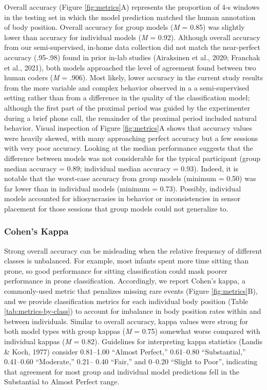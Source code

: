 \documentclass[
  man]{apa6}
\begin{document}
Overall accuracy (Figure \ref{fig:metrics}A) represents the proportion of 4-s windows in the testing set in which the model prediction matched the human annotation of body position. Overall accuracy for group models (\emph{M} = 0.85) was slightly lower than accuracy for individual models (\emph{M} = 0.92). Although overall accuracy from our semi-supervised, in-home data collection did not match the near-perfect accuracy (.95-.98) found in prior in-lab studies (Airaksinen et al., 2020; Franchak et al., 2021), both models approached the level of agreement found between two human coders (\emph{M} = .906). Most likely, lower accuracy in the current study results from the more variable and complex behavior observed in a a semi-supervised setting rather than from a difference in the quality of the classification model; although the first part of the proximal period was guided by the experimenter during a brief phone call, the remainder of the proximal period included natural behavior. Visual inspection of Figure \ref{fig:metrics}A shows that accuracy values were heavily skewed, with many approaching perfect accuracy but a few sessions with very poor accuracy. Looking at the median performance suggests that the difference between models was not considerable for the typical participant (group median accuracy = 0.89; individual median accuracy = 0.93). Indeed, it is notable that the worst-case accuracy from group models (minimum = 0.50) was far lower than in individual models (minimum = 0.73). Possibly, individual models accounted for idiosyncrasies in behavior or inconsistencies in sensor placement for those sessions that group models could not generalize to.

\hypertarget{cohens-kappa}{%
\subsubsection{Cohen's Kappa}\label{cohens-kappa}}

Strong overall accuracy can be misleading when the relative frequency of different classes is unbalanced. For example, most infants spent more time sitting than prone, so good performance for sitting classification could mask poorer performance in prone classification. Accordingly, we report Cohen's kappa, a commonly-used metric that penalizes missing rare events (Figure \ref{fig:metrics}B), and we provide classification metrics for each individual body position (Table \ref{tab:metrics-by-class}) to account for imbalance in body position rates within and between individuals. Similar to overall accuracy, kappa values were strong for both model types with group kappas (\emph{M} = 0.75) somewhat worse compared with individual kappas (\emph{M} = 0.82). Guidelines for interpreting kappa statistics (Landis \& Koch, 1977) consider 0.81--1.00 ``Almost Perfect,'' 0.61--0.80 ``Substantial,'' 0.41--0.60 ``Moderate,'' 0.21-- 0.40 ``Fair,'' and 0--0.20 ``Slight to Poor'', indicating that agreement for most group and individual model predictions fell in the Substantial to Almost Perfect range.
\end{document}
